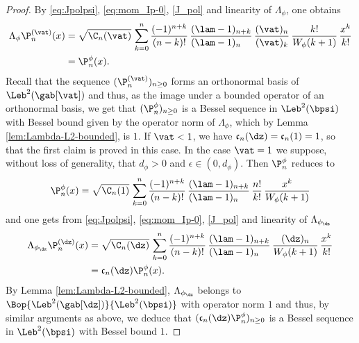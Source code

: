 \begin{proof}
By \eqref{eq:Jpolpsi}, \eqref{eq:mom_Ip-0}, \eqref{J_pol} and linearity of $\Lambda_{\phi}$, one obtains
\begin{equation}
\label{eq:LambdaP}
\begin{split}
\Lambda_\phi \P_n^{(\vat)}(x) &= \sqrt{\C_n(\vat)}\, \sum_{k=0}^n \frac{(-1)^{n+k}}{(n-k)!}\, \frac{(\lam-1)_{n+k}}{(\lam-1)_{n\phantom{+k}}}\, \frac{(\vat)_n}{(\vat)_k}\, \frac{k!}{W_\phi(k+1)}\, \frac{x^k}{k!}\\
&= \P_n^\phi(x).
\end{split}
\end{equation}
Recall that the sequence $(\P_n^{(\vat)})_{n \geq 0}$ forms an orthonormal basis of $\Leb^2(\gab[\vat])$ and thus, as the image under a bounded operator of an orthonormal basis, we get that $(\P_n^\phi)_{n \geq 0}$ is a Bessel sequence in $\Leb^2(\bpsi)$ with Bessel bound given by the operator norm of $\Lambda_\phi$, which by Lemma \ref{lem:Lambda-L2-bounded}, is $1$. If $\vat <1$, we have $\mathfrak{c}_n(\dz) = \mathfrak{c}_n(1) =1$, so that the first claim is proved in this case. In the case $\vat = 1$ we suppose, without loss of generality, that $d_\phi > 0$ and $\epsilon \in (0,d_\phi)$. Then $\P_n^\phi$ reduces to
\begin{equation*}
\P_n^\phi(x) = \sqrt{\C_n(1)}\, \sum_{k=0}^n \frac{(-1)^{n+k}}{(n-k)!} \,\frac{(\lam-1)_{n+k}}{(\lam-1)_{n\phantom{+k}}}\, \frac{n!}{k!}\, \frac{x^k}{W_{\phi}(k+1)}
\end{equation*}
and one gets from \eqref{eq:Jpolpsi}, \eqref{eq:mom_Ip-0}, \eqref{J_pol} and linearity of $\Lambda_{\phi_{\dz}}$
\begin{align*}
\Lambda_{\phi_{\dz}} \P_n^{(\dz)} (x)
&= \sqrt{\C_n(\dz)}\, \sum_{k=0}^n \frac{(-1)^{n+k}}{(n-k)!}\, \frac{(\lam-1)_{n+k}}{(\lam-1)_{n\phantom{+k}}} \,\frac{(\dz)_n}{W_\phi(k+1)}\, \frac{x^k}{k!}\\
&= \mathfrak{c}_n(\dz)\P^{\phi}_n(x).
\end{align*}
By Lemma \ref{lem:Lambda-L2-bounded}, $\Lambda_{\phi_{\dz}}$ belongs to $\Bop{\Leb^2(\gab[\dz])}{\Leb^2(\bpsi)}$ with operator norm $1$ and thus, by similar arguments as above, we deduce that $(\mathfrak{c}_n(\dz)\P^{\phi}_n)_{n \geq 0}$ is a Bessel sequence in $\Leb^2(\bpsi)$ with Bessel bound $1$.


\end{proof}
